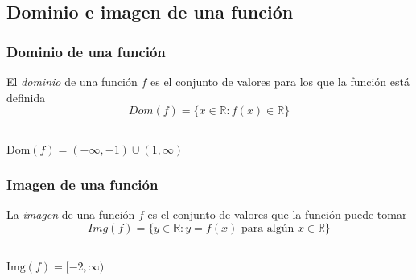 \subsection{Dominio e imagen de una función}
\begin{frame}
	\frametitle{Dominio de una función}
	\begin{definicion}
		El \emph{dominio} de una función $f$ es el conjunto de valores para los que la función está definida
		\[
			Dom(f)=\{x\in \mathbb{R}: f(x)\in \mathbb{R}\}
		\]
	\end{definicion}
	\begin{center}
		\scalebox{1}{}\\
		$\mbox{Dom}(f)=(-\infty,-1)\cup(1,\infty)$
	\end{center}
\end{frame} 


\begin{frame}
	\frametitle{Imagen de una función}
	\begin{definicion}
		La \emph{imagen} de una función $f$ es el conjunto de valores que la función puede tomar
		\[
			Img(f)=\{y\in \mathbb{R}: y=f(x) \mbox{ para algún } x\in\mathbb{R}\}
		\]
	\end{definicion}
	\begin{center}
		\scalebox{1}{}\\
		$\mbox{Img}(f)=[-2,\infty)$
		\end{center}
	\end{frame} 
	
	
	
